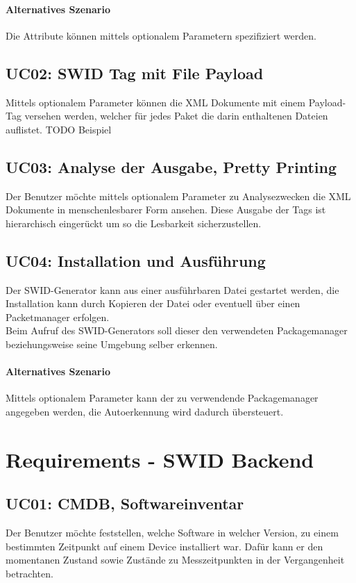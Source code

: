 \paragraph{Alternatives Szenario}
Die Attribute können mittels optionalem Parametern spezifiziert werden.

\subsection*{UC02: SWID Tag mit File Payload}
Mittels optionalem Parameter können die XML Dokumente mit einem Payload-Tag versehen werden, welcher für jedes Paket die darin enthaltenen Dateien auflistet.
TODO Beispiel

\subsection*{UC03: Analyse der Ausgabe, Pretty Printing}
Der Benutzer möchte mittels optionalem Parameter zu Analysezwecken die XML Dokumente in menschenlesbarer Form ansehen. Diese Ausgabe der Tags ist hierarchisch eingerückt um so die Lesbarkeit sicherzustellen.

\subsection*{UC04: Installation und Ausführung}
Der SWID-Generator kann aus einer ausführbaren Datei gestartet werden, die Installation kann durch Kopieren der Datei oder eventuell über einen Packetmanager erfolgen.\\
Beim Aufruf des SWID-Generators soll dieser den verwendeten Packagemanager beziehungsweise seine Umgebung selber erkennen.

\paragraph{Alternatives Szenario}
Mittels optionalem Parameter kann der zu verwendende Packagemanager angegeben werden, die Autoerkennung wird dadurch übersteuert.

\section{Requirements - SWID Backend}
\subsection*{UC01: CMDB, Softwareinventar}
Der Benutzer möchte feststellen, welche Software in welcher Version, zu einem bestimmten Zeitpunkt auf einem Device installiert war. Dafür kann er den momentanen Zustand sowie Zustände zu Messzeitpunkten in der Vergangenheit betrachten. 

